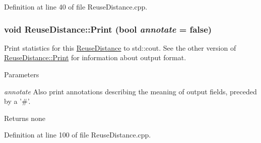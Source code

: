 Definition at line 40 of file ReuseDistance.cpp.

\hypertarget{class_reuse_distance_a2ce354238975243f602201787c9282ba}{
\subsubsection[{Print}]{\setlength{\rightskip}{0pt plus 5cm}void ReuseDistance::Print (bool {\em annotate} = {\ttfamily false})}}
\label{class_reuse_distance_a2ce354238975243f602201787c9282ba}
Print statistics for this \hyperlink{class_reuse_distance}{ReuseDistance} to std::cout. See the other version of \hyperlink{class_reuse_distance_ae693ec30500fcdd2222f0f07d207c0ce}{ReuseDistance::Print} for information about output format.


\begin{DoxyParams}{Parameters}
\item[{\em annotate}]Also print annotations describing the meaning of output fields, preceded by a '\#'.\end{DoxyParams}
\begin{DoxyReturn}{Returns}
none 
\end{DoxyReturn}


Definition at line 100 of file ReuseDistance.cpp.

